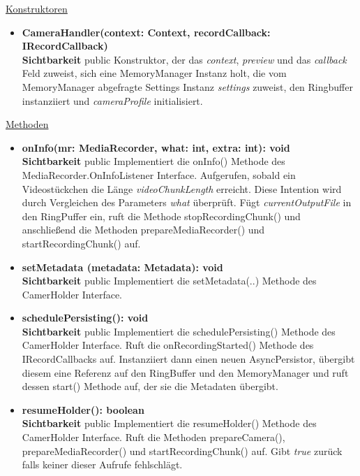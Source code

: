 \underline{Konstruktoren}
\begin{itemize}
\itemsep0pt
\item \textbf{CameraHandler(context: Context, recordCallback: IRecordCallback)} \hfill\\
\textbf{Sichtbarkeit} public\newline
Konstruktor, der das \textit{context}, \textit{preview} und das \textit{callback} Feld zuweist, sich eine MemoryManager Instanz holt, die vom MemoryManager abgefragte Settings Instanz \textit{settings} zuweist, den Ringbuffer instanziiert und \textit{cameraProfile} initialisiert.
\end{itemize}

\underline{Methoden}
\begin{itemize}
\itemsep0pt
\item \textbf{onInfo(mr: MediaRecorder, what: int, extra: int): void}\hfill\\
\textbf{Sichtbarkeit} public\newline
Implementiert die onInfo() Methode des MediaRecorder.OnInfoListener Interface. Aufgerufen, sobald ein Videostückchen die Länge \textit{videoChunkLength} erreicht. Diese Intention wird durch Vergleichen des Parameters \textit{what} überprüft. Fügt \textit{currentOutputFile} in den RingPuffer ein, ruft die Methode stopRecordingChunk() und anschließend die Methoden prepareMediaRecorder() und startRecordingChunk() auf.

\item \textbf{setMetadata (metadata: Metadata): void}\hfill\\
\textbf{Sichtbarkeit} public\newline
Implementiert die setMetadata(..) Methode des CamerHolder Interface.

\item \textbf{schedulePersisting(): void}\hfill\\
\textbf{Sichtbarkeit} public\newline
Implementiert die schedulePersisting() Methode des CamerHolder Interface. Ruft die onRecordingStarted() Methode des IRecordCallbacks auf. Instanziiert dann einen neuen AsyncPersistor, übergibt diesem eine Referenz auf den RingBuffer und den MemoryManager und ruft dessen start() Methode auf, der sie die Metadaten übergibt.

\item \textbf{resumeHolder(): boolean}\hfill\\
\textbf{Sichtbarkeit} public\newline
Implementiert die resumeHolder() Methode des CamerHolder Interface. Ruft die Methoden prepareCamera(), prepareMediaRecorder() und startRecordingChunk() auf. Gibt \textit{true} zurück falls keiner dieser Aufrufe fehlschlägt.


\end{itemize}
